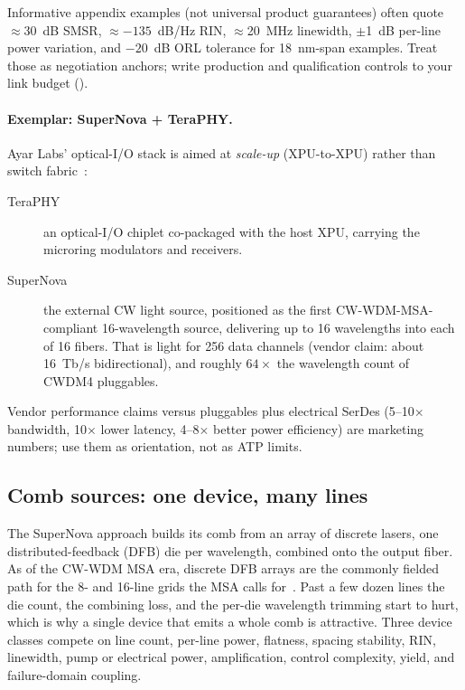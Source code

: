 Informative appendix examples (not universal product guarantees) often quote
$\approx$30~dB SMSR, $\approx-135$~dB/Hz RIN, $\approx$20~MHz linewidth,
$\pm$1~dB per-line power variation, and $-20$~dB ORL tolerance for 18~nm-span
examples.
Treat those as negotiation anchors; write production and qualification controls
to your link budget ().

\paragraph{Exemplar: SuperNova + TeraPHY.}
Ayar Labs' optical-I/O stack is aimed at \emph{scale-up} (XPU-to-XPU) rather than
switch fabric~:
\begin{description}
\item[TeraPHY] an optical-I/O chiplet co-packaged with the host XPU, carrying the
      microring modulators and receivers.
\item[SuperNova] the external CW light source, positioned as the first
      CW-WDM-MSA-compliant 16-wavelength source, delivering up to 16 wavelengths
      into each of 16 fibers. That is light for 256 data channels (vendor claim:
      about 16~Tb/s bidirectional), and roughly $64\times$ the wavelength count of
      CWDM4 pluggables.
\end{description}

Vendor performance claims versus pluggables plus electrical SerDes (5--10$\times$
bandwidth, 10$\times$ lower latency, 4--8$\times$ better power efficiency) are
marketing numbers; use them as orientation, not as ATP limits.

\subsection{Comb sources: one device, many lines}
\label{sec:comb-sources}

The SuperNova approach builds its comb from an array of discrete lasers, one
distributed-feedback (DFB) die per wavelength, combined onto the output fiber.
As of the CW-WDM MSA era, discrete DFB arrays are the commonly fielded path for
the 8- and 16-line grids the MSA calls for~. Past a few
dozen lines the die count, the combining loss, and the per-die wavelength
trimming start to hurt, which is why a single device that emits a whole comb is
attractive. Three device classes compete on line count, per-line power,
flatness, spacing stability, RIN, linewidth, pump or electrical power,
amplification, control complexity, yield, and failure-domain coupling.

